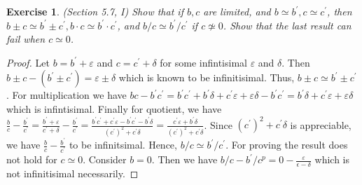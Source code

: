 \documentclass[a4paper, 11pt]{book}
\theoremstyle{plain}
\newtheorem{exercise}{Exercise}[chapter]
\theoremstyle{plain}
\newcommand{\p}{\prime}
\newcommand{\ep}{\varepsilon}
\newcommand{\del}{\delta}
\begin{document}
  \begin{exercise}
    (Section 5.7, I)
    Show that if $b,c$ are limited, and $b \simeq b^\p, c \simeq c^\p$, then $b \pm c \simeq b^\p \pm c^\p, b\cdot c \simeq b^\p \cdot c^\p$, and $b/c \simeq b^\p/c^\p$ if $c \not \simeq 0$. Show that the last result can fail when $c \simeq 0$.
  \end{exercise}
  \begin{proof}
    Let $b=b^\p+\ep$ and $c=c^\p +\del$ for some infintisimal $\ep$ and $\del$. Then $b \pm c - (b^\p \pm c^\p)=\ep \pm \del$ which is known to be infinitisimal. Thus, $b \pm c \simeq b^\p \pm c^\p$. For multiplication we have $bc-b^\p c^\p=b^\p c^\p+b^\p \del +c^\p \ep + \ep \del -b^\p c^\p=b^\p \del +c^\p \ep + \ep \del$ which is infintisimal. Finally for quotient, we have $\frac{b}{c}-\frac{b^\p}{c^\p}=\frac{b^\p +\ep}{c^\p+\del}-\frac{b^\p}{c^\p}=\frac{b^\p c^\p+c^\p \ep -b^\p c^\p-b^\p \del}{(c^\p)^2+c^\p \del}=\frac{c^\p \ep+b^\p \del}{(c^\p)^2+c^\p \del}$. Since $(c^\p)^2+c^\p \del$ is appreciable, we have $\frac{b}{c}-\frac{b^\p}{c^\p}$ to be infinitsimal. Hence, $b/c \simeq b^\p/c^\p$. For proving the result does not hold for $c \simeq 0$. Consider $b=0$. Then we have $b/c-b^\p/c^p=0-\frac{\ep}{\epsilon-\delta}$ which is not infinitisimal necessarily.
  \end{proof}
\end{document}
